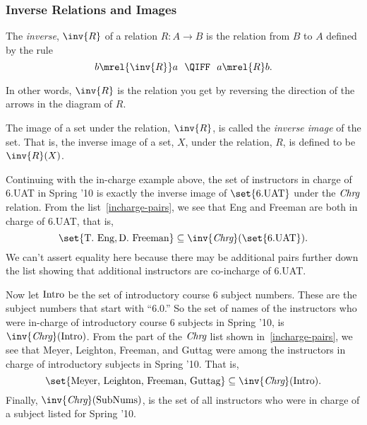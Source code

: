 \subsubsection{Inverse Relations and Images}

\begin{definition}
The \emph{inverse}, $\inv{R}$ of a relation $R: A \to B$ is the
relation from $B$ to $A$ defined by the rule
\[
b \mrel{\inv{R}} a\ \ \QIFF\ \ a \mrel{R} b.
\]
\end{definition}
In other words, $\inv{R}$ is the relation you get by reversing the
direction of the arrows in the diagram of $R$.

\begin{definition}
The image of a set under the relation, $\inv{R}$, is called
the \emph{inverse image}%
 of the set.  That is, the inverse image of a
set, $X$, under the relation, $R$, is defined to be $\inv{R}(X)$.
\end{definition}

Continuing with the in-charge example above, the set of instructors in
charge of 6.UAT in Spring '10 is exactly the inverse image of
$\set{\text{6.UAT}}$ under the $\textit{Chrg}$ relation.  From the
list~\eqref{incharge-pairs}, we see that Eng and Freeman are both in
charge of 6.UAT, that is,
\[
\set{\text{T. Eng}, \text{D. Freeman}} \subseteq \inv{\inchrg}(\set{\text{6.UAT}}).
\]
We can't assert equality here because there may be additional pairs
further down the list showing that additional instructors are
co-incharge of 6.UAT.

Now let $\text{Intro}$ be the set of introductory course 6 subject
numbers.  These are the subject numbers that start with ``6.0.''  So
the set of names of the instructors who were in-charge of introductory
course 6 subjects in Spring '10, is $\inv{\inchrg}(\introsub)$.  From
the part of the $\textit{Chrg}$ list shown in~\eqref{incharge-pairs}, we see
that Meyer, Leighton, Freeman, and Guttag were among the instructors
in charge of introductory subjects in Spring '10.  That is,
\[
\set{\text{Meyer, Leighton, Freeman, Guttag}} \subseteq \inv{\inchrg}(\introsub).
\]
Finally, $\inv{\inchrg}(\subnums)$, is the set of all instructors who
were in charge of a subject listed for Spring '10.

\iffalse
It gets interesting when we write composite expressions mixing images,
inverse images and set operations.  For example, $T(\inv{T}(D))$ is
the set of Spring '09 subjects that have an instructor in charge who
also is in in charge of an introductory subject.  So $T(\inv{T}(D)) -
D$ are the advanced subjects with someone in-charge who is also
in-charge of an introductory subject.  Similarly, $\inv{T}(D) \intersect
\inv{T}(N-D)$ is the set of faculty in charge of both an introductory \emph{and}
an advanced subject in Spring '09.
\fi

